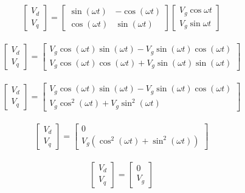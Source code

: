 \documentclass[a4paper,12pt]{iitmdiss}
\begin{document}
\begin{gather}
 \begin{bmatrix} V_d \\ V_q  \end{bmatrix}
 =
 \begin{bmatrix} \sin(\omega t) & -\cos(\omega t) \\ \cos(\omega t) & \sin(\omega t)  \end{bmatrix}
 \begin{bmatrix} V_g \cos{\omega t} \\ V_g \sin{\omega t}  \end{bmatrix}
\end{gather}


\begin{gather}
 \begin{bmatrix} V_d \\ V_q  \end{bmatrix}
 =
 \begin{bmatrix} V_g \cos(\omega t) \sin(\omega t) - V_g \sin(\omega t) \cos(\omega t) \\ V_g \cos(\omega t) \cos(\omega t) + V_g \sin(\omega t) \sin(\omega t)  \end{bmatrix}
\end{gather}


\begin{gather}
 \begin{bmatrix} V_d \\ V_q  \end{bmatrix}
 =
 \begin{bmatrix} V_g \cos(\omega t) \sin(\omega t) - V_g \sin(\omega t) \cos(\omega t) \\ V_g \cos^{2}(\omega t)  + V_g \sin^{2}(\omega t)   \end{bmatrix}
\end{gather}


\begin{gather}
 \begin{bmatrix} V_d \\ V_q  \end{bmatrix}
 =
 \begin{bmatrix} 0 \\ V_g (\cos^{2}(\omega t)  + \sin^{2}(\omega t))   \end{bmatrix}
\end{gather}

\begin{gather}
 \begin{bmatrix} V_d \\ V_q  \end{bmatrix}
 =
 \begin{bmatrix} 0 \\ V_g    \end{bmatrix}
\end{gather}
\end{document}
